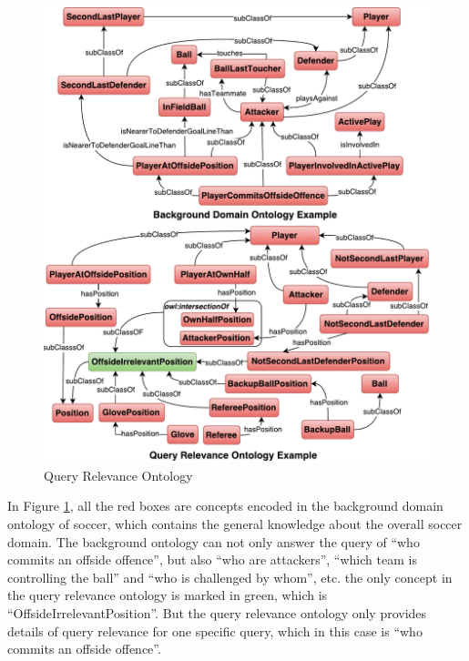 \begin{figure}[!htbp]
	\centering
    \includegraphics[width=5in]{img/3-siqreo.pdf}
    \caption{Query Relevance Ontology}
    \label{fig:3-siqreo}
\end{figure}

In Figure \ref{fig:3-siqreo}, all the red boxes are concepts encoded in the background domain ontology of soccer, which contains the general knowledge about the overall soccer domain. 
The background ontology can not only answer the query of ``who commits an offside offence'', but also ``who are attackers'', ``which team is controlling the ball'' and ``who is challenged by whom'', etc. 
the only concept in the query relevance ontology is marked in green, which is ``OffsideIrrelevantPosition''. 
But the query relevance ontology only provides details of query relevance for one specific query, which in this case is ``who commits an offside offence''. 

